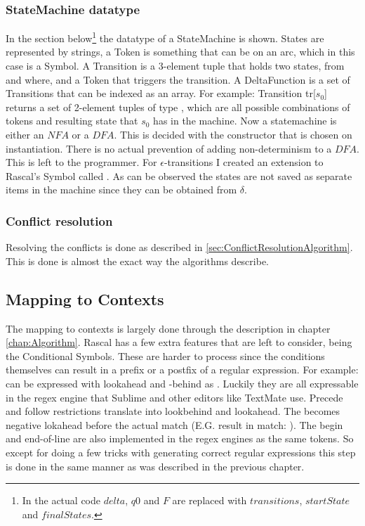 \subsubsection{StateMachine datatype} \label{sec:RascalStatemachine}
In the section below\footnote{In the actual code $delta$, $q0$ and $F$ are replaced with $transitions$, $startState$ and $finalStates$.} the datatype of a StateMachine is shown. States are represented by strings, a Token is something that can be on an arc, which in this case is a Symbol. A Transition is a 3-element tuple that holds two states, from and where, and a Token that triggers the transition. A DeltaFunction is a set of Transitions that can be indexed as an array. For example: Transition tr[$s_0$] returns a set of 2-element tuples of type , which are all possible combinations of tokens and resulting state that $s_0$ has in the machine. Now a statemachine is either an $NFA$ or a $DFA$. This is decided with the constructor that is chosen on instantiation. There is no actual prevention of adding non-determinism to a $DFA$. This is left to the programmer. For $\epsilon$-transitions I created an extension to Rascal's Symbol called \data{\\eps()}. As can be observed the states are not saved as separate items in the machine since they can be obtained from $\delta$.


\subsubsection{Conflict resolution} \label{sec:RascalConflicts}
Resolving the conflicts is done as described in \ref{sec:ConflictResolutionAlgorithm}. This is done is almost the exact way the algorithms describe. 

\subsection{Mapping to Contexts} \label{sec:RascalToContexts}
The mapping to contexts is largely done through the description in chapter \ref{chap:Algorithm}. Rascal has a few extra features that are left to consider, being the Conditional Symbols. These are harder to process since the conditions themselves can result in a prefix or a postfix of a regular expression. For example: \gram{[a-z] !<< [a-z]+ !>> [a-z]} can be expressed with lookahead and -behind as . Luckily they are all expressable in the regex engine that Sublime and other editors like TextMate use. Precede and follow restrictions translate into lookbehind and lookahead. The \data{\\delete(_)} becomes negative lokahead before the actual match (E.G.  result in match: ). The begin and end-of-line are also implemented in the regex engines as the same tokens. So except for doing a few tricks with generating correct regular expressions this step is done in the same manner as was described in the previous chapter.

